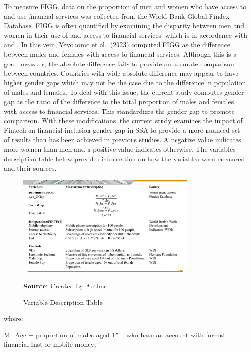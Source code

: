 \documentclass[preprint, 3p,
authoryear]{elsarticle} %
\begin{document}
To measure FIGG, data on the proportion of men and women who have access
to and use financial services was collected from the World Bank Global
Findex Database. FIGG is often quantified by examining the disparity
between men and women in their use of and access to financial services,
which is in accordance with \citet{adegbite2020bridging} and
\citet{tok2022fintech}. In this vein, Yeyouomo et al.~(2023) computed
FIGG as the difference between males and females with access to
financial services. Although this is a good measure, the absolute
difference fails to provide an accurate comparison between countries.
Countries with wide absolute difference may appear to have higher gender
gaps which may not be the case due to the difference in population of
males and females. To deal with this issue, the current study computes
gender gap as the ratio of the difference to the total proportion of
males and females with access to financial services. This standardizes
the gender gap to promote comparison. With these modifications, the
current study examines the impact of Fintech on financial inclusion
gender gap in SSA to provide a more nuanced set of results than has been
achieved in previous studies. A negative value indicates more women than
men and a positive value indicates otherwise. The variables description
table below provides information on how the variables were measured and
their sources.

\begin{figure}[ht]
  \centering
  \includegraphics[width=0.8\textwidth]{Var.Desc.Table.png}
  \caption{Variable Description Table}
  \label{fig:fig1}
  \textbf{Source:} Created by Author.
\end{figure}

\bigskip

where:

\vspace{1pt}

M\_Acc = proportion of males aged 15+ who have an account with formal
financial Inst or mobile money;
\end{document}
